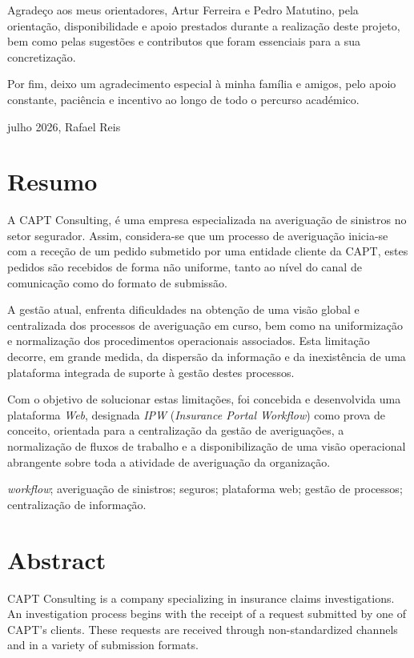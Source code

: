 \documentclass[a4paper,openright,twoside,11pt]{report}
\begin{document}
\noindent Agradeço aos meus orientadores, Artur Ferreira e Pedro Matutino, pela orientação, disponibilidade e apoio prestados durante a realização deste projeto, bem como pelas sugestões e contributos que foram essenciais para a sua concretização.

\noindent Por fim, deixo um agradecimento especial à minha família e amigos, pelo apoio constante, paciência e incentivo ao longo de todo o percurso académico.

\hfill julho 2026, Rafael Reis




\cleardoublepage
\chapter*{Resumo}
\noindent
A CAPT Consulting, é uma empresa especializada na averiguação de sinistros no setor segurador. Assim, considera-se que um processo de averiguação inicia-se com a receção de um pedido submetido por uma entidade cliente da CAPT, estes pedidos são recebidos de forma não uniforme, tanto ao nível do canal de comunicação como do formato de submissão.

A gestão atual, enfrenta dificuldades na obtenção de uma visão global e centralizada dos processos de averiguação em curso, bem como na uniformização e normalização dos procedimentos operacionais associados. Esta limitação decorre, em grande medida, da dispersão da informação e da inexistência de uma plataforma integrada de suporte à gestão destes processos.

Com o objetivo de solucionar estas limitações, foi concebida e desenvolvida uma plataforma \textit{Web}, designada \textit{IPW} (\textit{Insurance Portal Workflow}) como prova de conceito, orientada para a centralização da gestão de averiguações, a normalização de fluxos de trabalho e a disponibilização de uma visão operacional abrangente sobre toda a atividade de averiguação da organização.

\bigskip
{} \textit{workflow}; averiguação de sinistros; seguros; plataforma web; gestão de processos; centralização de informação.



\cleardoublepage
\chapter*{Abstract}
\noindent
CAPT Consulting is a company specializing in insurance claims investigations. An investigation process begins with the receipt of a request submitted by one of CAPT's clients. These requests are received through non-standardized channels and in a variety of submission formats.
\end{document}

